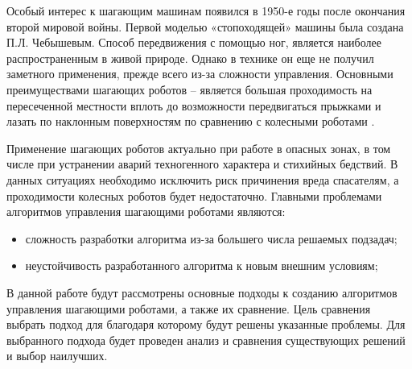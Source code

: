 
Особый интерес к шагающим машинам появился в 1950-е годы после окончания второй мировой войны. Первой моделью «стопоходящей» машины была создана П.Л. Чебышевым. 
Способ передвижения с помощью ног, является наиболее распространенным в живой природе. 
Однако в технике он еще не получил заметного применения, прежде всего из-за сложности управления.
Основными преимуществами шагающих роботов -- является большая проходимость на пересеченной местности вплоть до возможности передвигаться прыжками и лазать по наклонным поверхностям по сравнению с колесными роботами \cite{urevich}. 

Применение шагающих роботов актуально при работе в опасных зонах, в том числе при устранении аварий техногенного характера и стихийных бедствий. 
В данных ситуациях необходимо исключить риск причинения вреда спасателям, а проходимости колесных роботов будет недостаточно.
Главными проблемами алгоритмов управления шагающими роботами являются:
\begin{itemize}
	\item сложность разработки алгоритма из-за большего числа решаемых подзадач;
	\item неустойчивость разработанного алгоритма к новым внешним условиям;
\end{itemize}

В данной работе будут рассмотрены основные подходы к созданию алгоритмов управления шагающими роботами, а также их сравнение. 
Цель сравнения выбрать подход для благодаря которому будут решены указанные проблемы. 
Для выбранного подхода будет проведен анализ и сравнения существующих решений и выбор наилучших.

\clearpage
